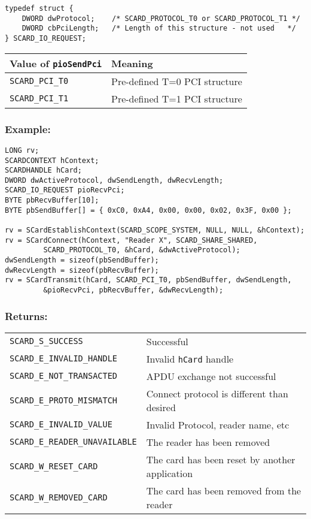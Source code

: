 \documentclass[a4paper,12pt]{article}
\newcommand{\example}{\subsubsection{Example:}}
\newcommand{\returns}{\subsubsection{Returns:}}
\begin{document}
\begin{verbatim}
typedef struct {
    DWORD dwProtocol;    /* SCARD_PROTOCOL_T0 or SCARD_PROTOCOL_T1 */
    DWORD cbPciLength;   /* Length of this structure - not used   */
} SCARD_IO_REQUEST;
\end{verbatim}

\begin{tabular}{|l|l|}
\hline
Value of \texttt{pioSendPci} & Meaning \\
\hline
\hline
\texttt{SCARD\_PCI\_T0} & Pre-defined T=0 PCI structure\\
\texttt{SCARD\_PCI\_T1} & Pre-defined T=1 PCI structure\\
\hline
\end{tabular}

\example

\begin{verbatim}
LONG rv;
SCARDCONTEXT hContext;
SCARDHANDLE hCard;
DWORD dwActiveProtocol, dwSendLength, dwRecvLength;
SCARD_IO_REQUEST pioRecvPci;
BYTE pbRecvBuffer[10];
BYTE pbSendBuffer[] = { 0xC0, 0xA4, 0x00, 0x00, 0x02, 0x3F, 0x00 };

rv = SCardEstablishContext(SCARD_SCOPE_SYSTEM, NULL, NULL, &hContext);
rv = SCardConnect(hContext, "Reader X", SCARD_SHARE_SHARED,
         SCARD_PROTOCOL_T0, &hCard, &dwActiveProtocol);
dwSendLength = sizeof(pbSendBuffer);
dwRecvLength = sizeof(pbRecvBuffer);
rv = SCardTransmit(hCard, SCARD_PCI_T0, pbSendBuffer, dwSendLength,
         &pioRecvPci, pbRecvBuffer, &dwRecvLength);
\end{verbatim}

\returns

\begin{tabular}{ll}
\texttt{SCARD\_S\_SUCCESS}			& Successful\\
\texttt{SCARD\_E\_INVALID\_HANDLE}		& Invalid \texttt{hCard} handle\\
\texttt{SCARD\_E\_NOT\_TRANSACTED}		& APDU exchange not successful\\
\texttt{SCARD\_E\_PROTO\_MISMATCH}		& Connect protocol is different than desired\\
\texttt{SCARD\_E\_INVALID\_VALUE}		& Invalid Protocol, reader name, etc\\
\texttt{SCARD\_E\_READER\_UNAVAILABLE} 	& The reader has been removed\\
\texttt{SCARD\_W\_RESET\_CARD}		& The card has been reset by another application\\
\texttt{SCARD\_W\_REMOVED\_CARD}		& The card has been removed from the reader\\
\end{tabular}
\end{document}
